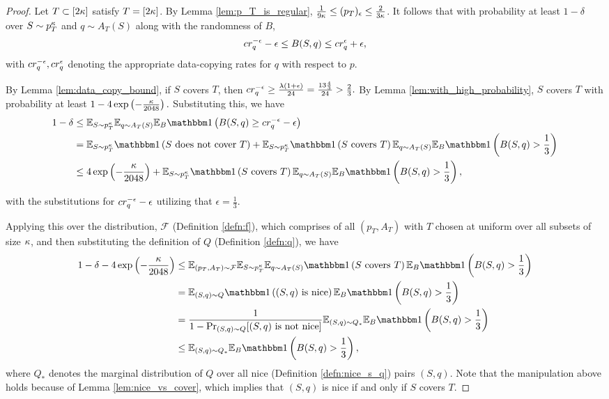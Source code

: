 \begin{proof}
Let $T \subset [2\kappa]$ satisfy $T = [2\kappa]$. By Lemma \ref{lem:p_T_is_regular}, $\frac{1}{9\kappa} \leq (p_T)_\epsilon \leq \frac{2}{3\kappa}$. It follows that with probability at least $1- \delta$ over $S \sim p_T^\kappa$ and  $q \sim A_T(S)$ along with the randomness of $B$, $$cr_q^{-\epsilon} - \epsilon \leq B(S, q) \leq cr_q^{\epsilon} + \epsilon,$$ with $cr_q^{-\epsilon}, cr_q^{\epsilon}$ denoting the appropriate data-copying rates for $q$ with respect to $p$.  

By Lemma \ref{lem:data_copy_bound}, if $S$ covers $T$, then $cr_q^{-\epsilon} \geq \frac{\lambda(1+\epsilon)}{24} = \frac{13\frac{4}{3}}{24} > \frac{2}{3}.$ By Lemma \ref{lem:with_high_probability}, $S$ covers $T$ with probability at least $1 - 4\exp\left(-\frac{\kappa}{2048}\right).$ Substituting this, we have 
\begin{equation*}
\begin{split}
1 - \delta &\leq \E_{S \sim p_T^\a} \E_{q \sim A_T(S)} \E_B \ind\left(B(S, q) \geq \c_q^{-\epsilon}- \epsilon \right)\\
&= \E_{S \sim p_T^\a} \ind\left(S\text{ does not cover }T\right) + \E_{S \sim p_T^\a}\ind\left(S\text{ covers }T\right)\E_{q \sim A_T(S)}\E_B \ind\left(B(S, q) > \frac{1}{3} \right) \\
&\leq 4\exp\left(-\frac{\a}{2048}\right) + \E_{S \sim p_T^\a}\ind\left(S\text{ covers }T\right)\E_{q \sim A_T(S)}\E_B \ind\left(B(S, q) > \frac{1}{3} \right),
\end{split}
\end{equation*}

with the substitutions for $cr_q^{-\epsilon} - \epsilon$ utilizing that $\epsilon = \frac{1}{3}$. 

Applying this over the distribution, $\mathcal{F}$ (Definition \ref{defn:f}), which comprises of all $(p_T, A_T)$ with $T$ chosen at uniform over all subsets of size $\kappa$, and then substituting the definition of $Q$ (Definition \ref{defn:q}), we have 
\begin{equation}\label{eqn:final_good}
\begin{split}
1 - \delta -  4\exp\left(-\frac{\a}{2048}\right) &\leq \mathbb{E}_{(p_T, A_T) \sim \mathcal{F}} \mathbb{E}_{S \sim p_T^\a}\mathbb{E}_{q \sim A_T(S)} \ind\left(S\text{ covers }T\right)\mathbb{E}_{B}\ind\left(B(S, q) > \frac{1}{3}\right)\\
&= \mathbb{E}_{(S, q) \sim Q}\ind\left((S, q)\text{ is nice}\right)\mathbb{E}_{B}\ind\left(B(S, q) > \frac{1}{3}\right) \\
&= \frac{1}{1 - \Pr_{(S, q) \sim Q}[(S, q)\text{ is not nice}]}\mathbb{E}_{(S, q) \sim Q_*}\mathbb{E}_{B}\ind\left(B(S, q) > \frac{1}{3}\right) \\
&\leq \mathbb{E}_{(S, q) \sim Q_*}\mathbb{E}_{B}\ind\left(B(S, q) > \frac{1}{3}\right),
\end{split}
\end{equation}
where $Q_*$ denotes the marginal distribution of $Q$ over all nice (Definition \ref{defn:nice_s_q}) pairs $(S, q)$. Note that the manipulation above holds because of Lemma \ref{lem:nice_vs_cover}, which implies that $(S, q)$ is nice if and only if $S$ covers $T$. 


\end{proof}
